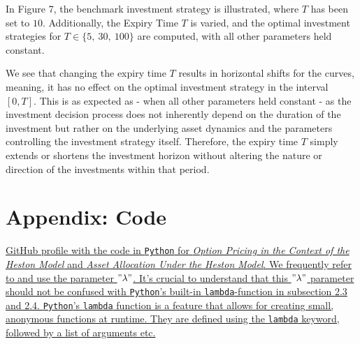 \documentclass[11pt]{article}
\numberwithin{equation}{section}
\begin{document}
In Figure 7, the benchmark investment strategy is illustrated, where $T$ has
been set to $10$. Additionally, the Expiry Time $T$ is varied, and the
optimal investment strategies for $T \in \{5, \:30,\: 100\}$ are computed,
with all other parameters held constant.

We see that changing the expiry time $T$ results in horizontal shifts for the
curves, meaning, it has no effect on the optimal investment strategy in the
interval $[0,T]$. This is as expected as - when all other parameters held
constant - as the investment decision process does not inherently depend on the
duration of the investment but rather on the underlying asset dynamics and the
parameters controlling the investment strategy itself. Therefore, the expiry
time $T$ simply extends or shortens the investment horizon without altering the
nature or direction of the investments within that period.
\newpage
\appendix
\section{Appendix: Code}\label{chap:code}
\href{https://github.com/YoussefRaad-mathecon/Handin-3}{GitHub profile
with the code in \texttt{Python} for \textit{Option Pricing in the Context of the Heston
Model} and \textit{Asset Allocation Under the Heston Model}. We frequently refer
to and use the parameter $"\lambda"$. It's crucial to understand that this
$"\lambda"$ parameter should not be confused with \texttt{Python}'s
built-in \texttt{lambda}-function in subsection 2.3 and 2.4. \texttt{Python}'s \texttt{lambda} function
is a feature that allows for creating small, anonymous functions at runtime.
They are defined using the \texttt{lambda} keyword, followed by a list of
arguments etc.}

\newpage



\end{document}
